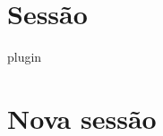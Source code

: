 \section{Sessão}\label{sec}

\lipsum		%

\cite{python}
\gls{plugin}	%
\cite{thepdf}
\lipsum[3]		%

\clearpage %
\section{Nova sessão} %
\label{sec:nova_sess_o}

\lipsum[2]		%